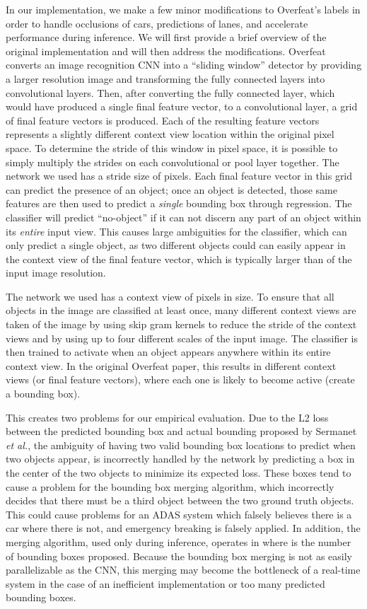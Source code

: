 \documentclass[journal]{IEEEtran}
\begin{document}
In our implementation, we make a few minor modifications to Overfeat's labels in order to handle occlusions of cars, predictions of lanes, and accelerate performance during inference. We will first provide a brief overview of the original implementation and will then address the modifications. Overfeat converts an image recognition CNN into a ``sliding window'' detector by providing a larger resolution image and transforming the fully connected layers into convolutional layers. Then, after converting the fully connected layer, which would have produced a single final feature vector, to a convolutional layer, a grid of final feature vectors is produced. Each of the resulting feature vectors represents a slightly different context view location within the original pixel space. To determine the stride of this window in pixel space, it is possible to simply multiply the strides on each convolutional or pool layer together. The network we used has a stride size of  pixels. Each final feature vector in this grid can predict the presence of an object; once an object is detected, those same features are then used to predict a \textit{single} bounding box through regression. The classifier will predict ``no-object'' if it can not discern any part of an object within its \textit{entire} input view. This causes large ambiguities for the classifier, which can only predict a single object, as two different objects could can easily appear in the context view of the final feature vector, which is typically larger than  of the input image resolution. 

The network we used has a context view of  pixels in size. To ensure that all objects in the image are classified at least once, many different context views are taken of the image by using skip gram kernels to reduce the stride of the context views and by using up to four different scales of the input image. The classifier is then trained to activate when an object appears anywhere within its entire context view. In the original Overfeat paper, this results in  different context views (or final feature vectors), where each one is likely to become active (create a bounding box).

This creates two problems for our empirical evaluation. Due to the L2 loss between the predicted bounding box and actual bounding proposed by Sermanet \textit{et al.}, the ambiguity of having two valid bounding box locations to predict when two objects appear, is incorrectly handled by the network by predicting a box in the center of the two objects to minimize its expected loss. These boxes tend to cause a problem for the bounding box merging algorithm, which incorrectly decides that there must be a third object between the two ground truth objects. This could cause problems for an ADAS system which falsely believes there is a car where there is not, and emergency breaking is falsely applied. In addition, the merging algorithm, used only during inference, operates in  where  is the number of bounding boxes proposed. Because the bounding box merging is not as easily parallelizable as the CNN, this merging may become the bottleneck of a real-time system in the case of an inefficient implementation or too many predicted bounding boxes.  
\end{document}
